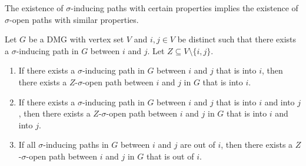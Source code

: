 The existence of $\sigma$-inducing paths with certain properties implies the existence of $\sigma$-open paths with similar properties.
\begin{Prp}\label{prp:sigma-inducing_path_orientations}
  Let $G$ be a DMG with vertex set $V$ and $i,j \in V$ be distinct such that there exists a $\sigma$-inducing path in $G$ between $i$ and $j$.
  Let $Z \subseteq V \setminus \{i,j\}$.
  \begin{enumerate}[label=(\arabic*)]
    \item If there exists a $\sigma$-inducing path in $G$ between $i$ and $j$ that is into $i$, then there exists a $Z$-$\sigma$-open path between $i$ and $j$ in $G$ that is into $i$.
    \item If there exists a $\sigma$-inducing path in $G$ between $i$ and $j$ that is into $i$ and into $j$, then there exists a $Z$-$\sigma$-open path between $i$ and $j$ in $G$ that is into $i$ and into $j$.
    \item If all $\sigma$-inducing paths in $G$ between $i$ and $j$ are out of $i$, then there exists a $Z$-$\sigma$-open path between $i$ and $j$ in $G$ that is out of $i$.
  \end{enumerate}
\end{Prp}
